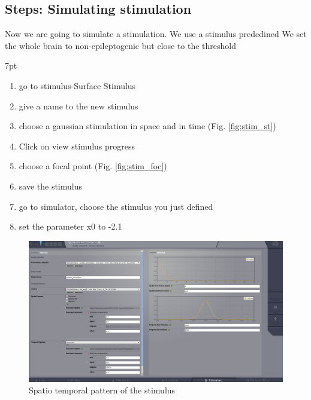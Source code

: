 \documentclass{tufte-handout}
\newenvironment{simulation}{%
  \def\FrameCommand{%
    \hspace{1pt}%
    {\color{ForestGreen}\vrule width 2pt}%
    {\color{simulationshade}\vrule width 4pt}%
    \colorbox{simulationshade}%
  }%
  \MakeFramed{\advance\hsize-\width\FrameRestore}%
  \noindent\hspace{-4.55pt}%
  \begin{adjustwidth}{}{7pt}%
  \vspace{2pt}\vspace{2pt}%
}
{%
  \vspace{2pt}\end{adjustwidth}\endMakeFramed%
}
\begin{document}
\subsection{Steps: Simulating stimulation}

Now we are going to simulate a stimulation.
We use a stimulus prededined
We  set the whole brain to non-epileptogenic but close to the threshold

  \begin{simulation}
  \begin{enumerate}
  \item go to stimulus-Surface Stimulus
  \item give a name to the new stimulus
  \item choose a gaussian stimulation in space and in time (Fig. \ref{fig;stim_st})
  \item Click on view stimulus progress
  \item choose a focal point (Fig. \ref{fig;stim_foc})
  \item save the stimulus
  \item go to simulator, choose the stimulus you just defined
  \item set the parameter x0 to -2.1
 
\end{enumerate}
\end{simulation}

\begin{figure}[h]
  \includegraphics[width=\linewidth]{Handout_UI_ModellingAnEpilepticPatient_StimulationSpatioTemporalPattern}%
  \caption{Spatio temporal pattern of the stimulus}%
  \label{fig:stim_st}%
\end{figure}
\end{document}
